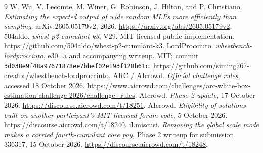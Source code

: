 \documentclass[10pt]{article}
\begin{document}
\clearpage
\small
\begin{thebibliography}{9}\setlength{\itemsep}{2pt}
 W. Wu, V. Lecomte, M. Winer, G. Robinson, J. Hilton, and P. Christiano.
\emph{Estimating the expected output of wide random MLPs more efficiently than sampling}.
arXiv:2605.05179v2, 2026. \url{https://arxiv.org/abs/2605.05179v2}.
 504aldo. \emph{whest-p2-cumulant-k3}, V29. MIT-licensed public implementation.
\url{https://github.com/504aldo/whest-p2-cumulant-k3}.
 LordProcciuto. \emph{whestbench-lordprocciuto}, e30\_a and accompanying writeup.
MIT; commit \texttt{3d038e9f48a97671878ee7bbef02e193f128b61c}.
\url{https://github.com/siming767-creator/whestbench-lordprocciuto}.
 ARC / AIcrowd. \emph{Official challenge rules}, accessed 18 October 2026.
\url{https://www.aicrowd.com/challenges/arc-white-box-estimation-challenge-2026/challenge_rules}.
 AIcrowd. \emph{Phase 2 update}, 17 October 2026.
\url{https://discourse.aicrowd.com/t/18251}.
 AIcrowd. \emph{Eligibility of solutions built on another participant's MIT-licensed forum code},
5 October 2026. \url{https://discourse.aicrowd.com/t/18240}.
 il.miscusi. \emph{Removing the global scale mode makes a carried
fourth-cumulant core pay}, Phase 2 writeup for submission 336317,
15 October 2026. \url{https://discourse.aicrowd.com/t/18248}.
\end{thebibliography}
\normalsize

\end{document}
